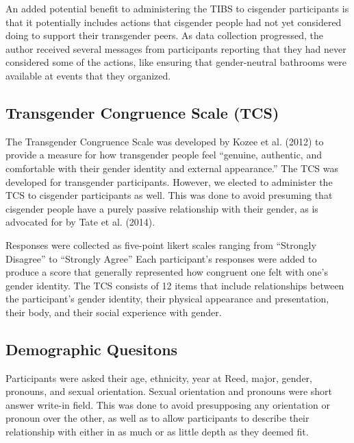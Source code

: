 \documentclass[12pt,twoside]{reedthesis}
\begin{document}
An added potential benefit to administering the TIBS to cisgender participants is that it potentially includes actions that cisgender people had not yet considered doing to support their transgender peers. As data collection progressed, the author received several messages from participants reporting that they had never considered some of the actions, like ensuring that gender-neutral bathrooms were available at events that they organized.

\hypertarget{transgender-congruence-scale-tcs}{%
\subsection{Transgender Congruence Scale (TCS)}\label{transgender-congruence-scale-tcs}}

The Transgender Congruence Scale was developed by Kozee et al. (2012) to provide a measure for how transgender people feel ``genuine, authentic, and comfortable with their gender identity and external appearance.'' The TCS was developed for transgender participants. However, we elected to administer the TCS to cisgender participants as well. This was done to avoid presuming that cisgender people have a purely passive relationship with their gender, as is advocated for by Tate et al. (2014).

Responses were collected as five-point likert scales ranging from ``Strongly Disagree'' to ``Strongly Agree'' Each participant's responses were added to produce a score that generally represented how congruent one felt with one's gender identity. The TCS consists of 12 items that include relationships between the participant's gender identity, their physical appearance and presentation, their body, and their social experience with gender.

\hypertarget{demographic-quesitons}{%
\subsection{Demographic Quesitons}\label{demographic-quesitons}}

Participants were asked their age, ethnicity, year at Reed, major, gender, pronouns, and sexual orientation. Sexual orientation and pronouns were short answer write-in field. This was done to avoid presupposing any orientation or pronoun over the other, as well as to allow participants to describe their relationship with either in as much or as little depth as they deemed fit.
\end{document}
